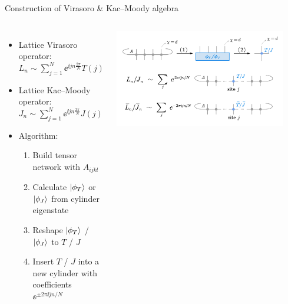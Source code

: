 \documentclass{fdubeamer}
\begin{document}
\begin{frame}{Construction of Virasoro \& Kac--Moody algebra}

\begin{columns}[c]


    \begin{itemize}
      \item Lattice Virasoro operator: \\
        \mbox{\quad} $L_n \sim \sum_{j=1}^N \ee^{ \ii j n \frac{2\pi}{N}} T(j)$
      \item Lattice Kac--Moody operator: \\
        \mbox{\quad} $J_n \sim \sum_{j=1}^N \ee^{ \ii j n \frac{2\pi}{N}} J(j)$
      \item Algorithm:

        \begin{enumerate}
          \item Build tensor network with $A_{ijkl}$
          \item Calculate $\ket{\phi_T}$ or $\ket{\phi_J}$ from cylinder eigenstate
          \item Reshape $\ket{\phi_T}$ / $\ket{\phi_J}$ to $T$ / $J$
          \item Insert $T$ / $J$ into a new cylinder with coefficients $\ee^{\pm2\pi\ii j n/N}$
        \end{enumerate}
    \end{itemize}


    \centering
    \includegraphics[width=0.9\textwidth]{images/virasoro/construction.pdf}

\end{columns}


\end{frame}
\end{document}
